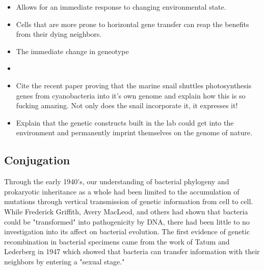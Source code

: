 \begin{itemize}
	\item Allows for an immediate response to changing environmental state.
	\item Cells that are more prone to horizontal gene transfer can reap the
		benefits from their dying neighbors. 
	\item The immediate change in geneotype 
\end{itemize}
\begin{itemize}
	\item  
	\item Cite the recent paper proving that the marine snail shuttles
		photosynthesis genes from cyanobacteria into it's own genome and
		explain how this is so fucking amazing. Not only does the snail
		incorporate it, it expresses it!
	\item Explain that the genetic constructs built in the lab could get
		into the environment and permanently imprint themselves on the
		genome of nature. 
\end{itemize}
\subsection*{Conjugation}
Through the early 1940's, our understanding of bacterial phylogeny and
prokaryotic inheritance as a whole had been limited to the accumulation of
mutations through vertical transmission of genetic information from cell to
cell. While Frederick Griffith, Avery MacLeod, and others had shown that
bacteria could be "transformed" into pathogenicity by
DNA\cite{Griffith:1928vg}\cite{Avery:2014wx}, there had been little to no
investigation into its affect on bacterial evolution. The first evidence of
genetic recombination in bacterial specimens came from the work of Tatum and
Lederberg in 1947 which showed that bacteria can transfer information with their
neighbors by entering a "sexual stage."\cite{Tatum:1947va}

